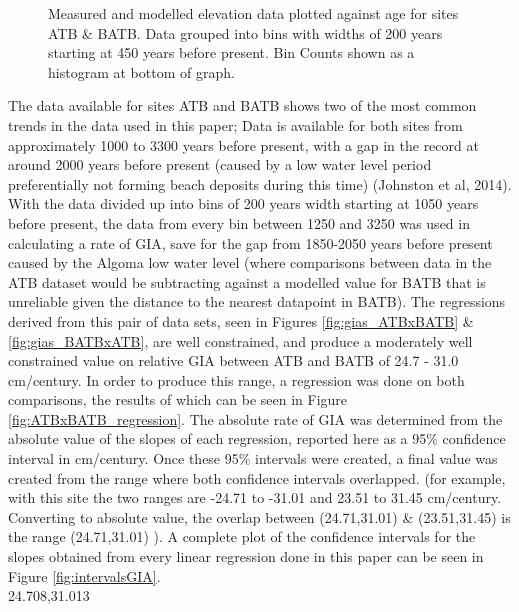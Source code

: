 \begin{figure}[H]
	\caption{Measured and modelled elevation data plotted against age for sites ATB \& BATB. Data grouped into bins with widths of 200 years starting at 450 years before present. Bin Counts shown as a histogram at bottom of graph.}
	\label{fig:data_ATBxBATB}
\end{figure}
The data available for sites ATB and BATB shows two of the most common trends in
 the data used in this paper; Data is available for both sites from
 approximately 1000 to 3300 years before present,
 with a gap in the record at around 2000 years before present (caused by a low
 water level period preferentially not forming beach deposits during this time)
 (Johnston et al, 2014). With the data divided up into bins of 200 years width
 starting at 1050 years before present, the data from every bin between 1250 and 3250 was used
 in calculating a rate of GIA, save for the gap from 1850-2050 years before
 present caused by the Algoma low water level (where comparisons between data in the ATB dataset would be
 subtracting against a modelled value for BATB that is unreliable given
 the distance to the nearest datapoint in BATB). The regressions derived from this pair of data sets,
 seen in Figures \ref{fig:gias_ATBxBATB} \& \ref{fig:gias_BATBxATB}, are well
 constrained, and produce a moderately well constrained value on relative GIA
 between ATB and BATB of 24.7 - 31.0 cm/century. In order to produce this range, a
 regression was done on both comparisons, the results of which can be seen in
 Figure \ref{fig:ATBxBATB_regression}. The absolute rate of GIA was determined from the
 absolute value of the slopes of each regression, reported here as a 95\% confidence interval
 in cm/century. Once these 95\% intervals were created, a final value was created
 from the range where both confidence intervals overlapped. (for example, with this
 site the two ranges are -24.71 to -31.01 and 23.51 to 31.45 cm/century. Converting
 to absolute value, the overlap between (24.71,31.01) \& (23.51,31.45) is the range
 (24.71,31.01) ). A complete plot of the confidence intervals
 for the slopes obtained from every linear regression done in this paper can be seen in Figure \ref{fig:intervalsGIA}. \\
24.708,31.013

